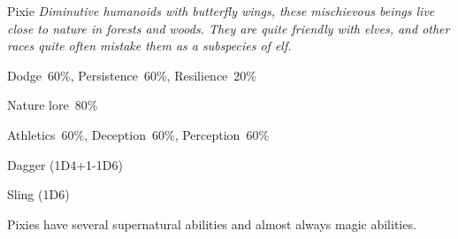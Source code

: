 \begin{monsterbox}{Pixie}
	\textit{Diminutive humanoids with butterfly wings, these mischievous beings live close to nature in forests and woods. They are quite friendly with elves, and other races quite often mistake them as a subspecies of elf.}\\
	\rpghline
	\basics[%
        hitpoints  = 8, 
	majorwound = 4,
	damagemodifier = -1D6,
	powerpoints = 13,
	movementrate = {15m, 30m when flying},
	armor = None,
	plunderrating = 0
	]
	\rpghline%
	\stats[ %
		STR = 2D3  (4),
		CON = 3D6  (11),
		DEX = 4D6  (14),
		SIZ = 1D6  (4),
		INT = 3D6   (11),
		POW = 2D6+6 (13),
		CHA = 3D6   (11)
	]
	\rpghline%
	\begin{rpg-monsteraction}[Resistances]
		Dodge~60\%, Persistence~60\%, Resilience~20\%
	\end{rpg-monsteraction}
	\begin{rpg-monsteraction}[Knowledge]
    		Nature lore~80\%
	\end{rpg-monsteraction}
	\begin{rpg-monsteraction}[Practical]
		Athletics~60\%, Deception~60\%, Perception~60\%
	\end{rpg-monsteraction}
	\begin{rpg-monsteraction}
		Dagger (1D4+1-1D6)
	\end{rpg-monsteraction}
	\begin{rpg-monsteraction}
		Sling (1D6)
	\end{rpg-monsteraction}
	\begin{rpg-monsteraction}[Supernatural]
		Pixies have several supernatural abilities and almost always magic abilities.
	\end{rpg-monsteraction}


\end{monsterbox}



